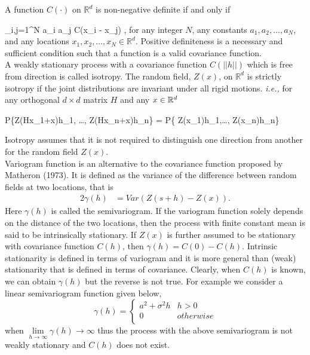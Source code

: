 A function $C(\cdot)$ on $\mathbb{R}^d$ is non-negative definite if and only if

\beq \label{cov_pd}
\sum_{i,j=1}^{N} a_i a_j C(x_i - x_j) ,
\eeq
for any integer $N$, any constants $a_1, a_2, \ldots, a_N$, and any locations $x_1, x_2, \ldots, x_N \in \mathbb{R}^d$. Positive definiteness is a necessary and sufficient condition such that a function is a valid covariance function. \\

		
A weakly stationary process with a covariance function $C(||h||)$ which is free from direction is called isotropy. The random field, $Z(x)$, on $\mathbb{R}^d$ is strictly isotropy if the joint distributions are invariant under all rigid motions. {\em i.e.,} for any orthogonal $d\times d$ matrix $H$ and any $x\in \mathbb{R}^d$

\beq
P\{Z(Hx_1+x)\le h_1, \ldots, Z(Hx_n+x)\le h_n\} = P\{ Z(x_1)\le h_1,\ldots, Z(x_n)\le h_n\}
\eeq

Isotropy assumes that it is not required to distinguish one direction from another for the random field $Z(x)$.\\

Variogram function is an alternative to the covariance function proposed by Matheron (1973). It is defined as the variance of the difference between random fields at two locations, that is
\begin{align}
	2\gamma(h) & = Var(Z(s+h) -Z(x)).
\end{align}
Here $\gamma(h)$ is called the semivariogram. If the variogram function solely depends on the distance of the two locations, then the process with finite constant mean is said to be intrinsically stationary. If $Z(x)$ is further assumed to be stationary with covariance function $C(h)$, then $\gamma(h) = C(0) - C(h)$. Intrinsic stationarity is defined in terms of variogram and it is more general than (weak) stationarity that is defined in terms of covariance. Clearly, when $C(h)$ is known, we can obtain $\gamma(h)$ but the reverse is not true. For example we consider a linear semivariogram function given below,
\[
	\gamma(h) = \left \{ \begin{array}{cc}
	a^2+\sigma^2h & h>0 \\
	0 & otherwise \\
	\end{array}
	\right.
\]
when $\underset{h \to \infty} {\lim} \gamma(h) \to \infty$ thus the process with the above semivariogram is not weakly stationary and $C(h)$ does not exist. \\

